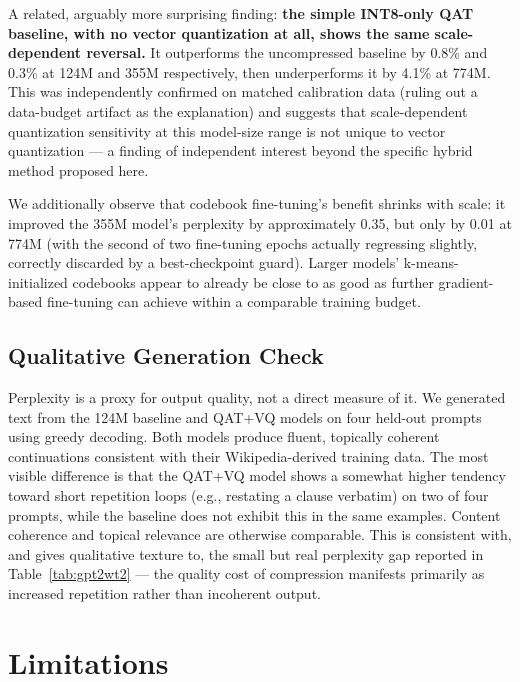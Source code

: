 \documentclass[11pt]{article}
\begin{document}
A related, arguably more surprising finding: \textbf{the simple INT8-only
QAT baseline, with no vector quantization at all, shows the same
scale-dependent reversal.} It outperforms the uncompressed baseline by
0.8\% and 0.3\% at 124M and 355M respectively, then underperforms it by
4.1\% at 774M. This was independently confirmed on matched calibration
data (ruling out a data-budget artifact as the explanation) and suggests
that scale-dependent quantization sensitivity at this model-size range is
not unique to vector quantization --- a finding of independent interest
beyond the specific hybrid method proposed here.

We additionally observe that codebook fine-tuning's benefit shrinks with
scale: it improved the 355M model's perplexity by approximately 0.35,
but only by 0.01 at 774M (with the second of two fine-tuning epochs
actually regressing slightly, correctly discarded by a best-checkpoint
guard). Larger models' k-means-initialized codebooks appear to already be
close to as good as further gradient-based fine-tuning can achieve within
a comparable training budget.

\subsection{Qualitative Generation Check}

Perplexity is a proxy for output quality, not a direct measure of it. We
generated text from the 124M baseline and QAT+VQ models on four held-out
prompts using greedy decoding. Both models produce fluent, topically
coherent continuations consistent with their Wikipedia-derived training
data. The most visible difference is that the QAT+VQ model shows a
somewhat higher tendency toward short repetition loops (e.g., restating a
clause verbatim) on two of four prompts, while the baseline does not
exhibit this in the same examples. Content coherence and topical relevance
are otherwise comparable. This is consistent with, and gives qualitative
texture to, the small but real perplexity gap reported in
Table~\ref{tab:gpt2wt2} --- the quality cost of compression manifests
primarily as increased repetition rather than incoherent output.

\section{Limitations}
\end{document}
